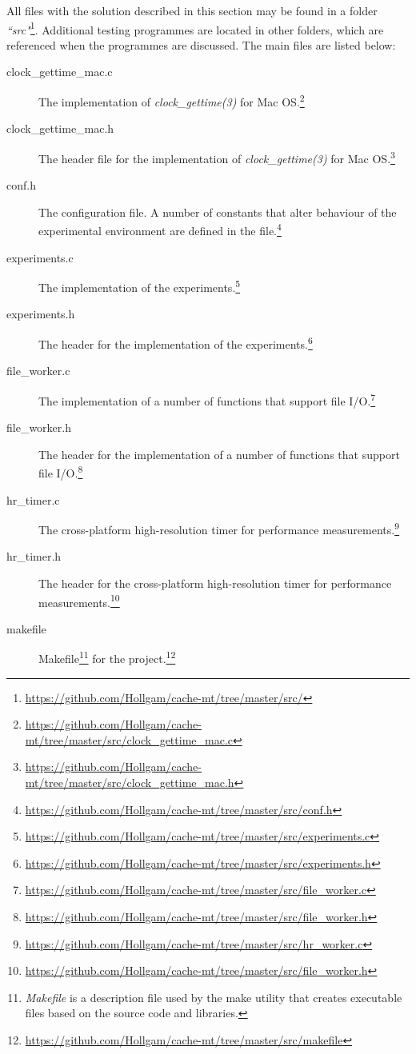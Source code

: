 All files with the solution described in this section may be found in a folder \textit{``src"}\footnote{\url{https://github.com/Hollgam/cache-mt/tree/master/src/}}. Additional testing programmes are located in other folders, which are referenced when the programmes are discussed. The main files are listed below:

\begin{description}
  \item[clock\_gettime\_mac.c] The implementation of \textit{clock\_gettime(3)} for Mac OS.\footnote{\url{https://github.com/Hollgam/cache-mt/tree/master/src/clock\_gettime\_mac.c}}
  \item[clock\_gettime\_mac.h] The header file for the implementation of \textit{clock\_gettime(3)} for Mac OS.\footnote{\url{https://github.com/Hollgam/cache-mt/tree/master/src/clock\_gettime\_mac.h}}
  \item[conf.h] The configuration file. A number of constants that alter behaviour of the experimental environment are defined in the file.\footnote{\url{https://github.com/Hollgam/cache-mt/tree/master/src/conf.h}}
  \item[experiments.c] The implementation of the experiments.\footnote{\url{https://github.com/Hollgam/cache-mt/tree/master/src/experiments.c}}
  \item[experiments.h] The header for the implementation of the experiments.\footnote{\url{https://github.com/Hollgam/cache-mt/tree/master/src/experiments.h}}
  \item[file\_worker.c] The implementation of a number of functions that support file I/O.\footnote{\url{https://github.com/Hollgam/cache-mt/tree/master/src/file\_worker.c}}
  \item[file\_worker.h] The header for the implementation of a number of functions that support file I/O.\footnote{\url{https://github.com/Hollgam/cache-mt/tree/master/src/file\_worker.h}}
  \item[hr\_timer.c] The cross-platform high-resolution timer for performance measurements.\footnote{\url{https://github.com/Hollgam/cache-mt/tree/master/src/hr\_worker.c}}
  \item[hr\_timer.h] The header for the cross-platform high-resolution timer for performance measurements.\footnote{\url{https://github.com/Hollgam/cache-mt/tree/master/src/file\_worker.h}}
  \item[makefile] Makefile\footnote{\textit{Makefile} is a description file used by the make utility that creates executable files based on the source code and libraries.} for the project.\footnote{\url{https://github.com/Hollgam/cache-mt/tree/master/src/makefile}}

\end{description}

